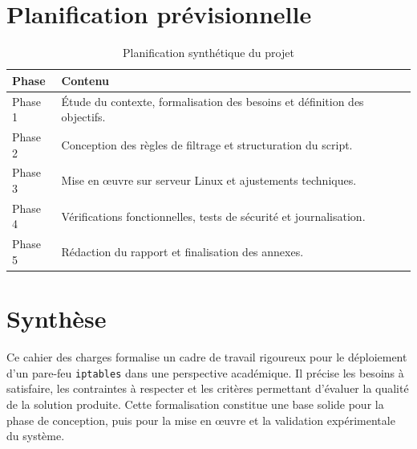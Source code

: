 \section{Planification prévisionnelle}

\begin{table}[H]
\centering
\caption{Planification synthétique du projet}
\begin{tabularx}{\textwidth}{|p{2.5cm}|X|}
\hline
\rowcolor{gray!20}
\textbf{Phase} & \textbf{Contenu} \\
\hline
Phase 1 & Étude du contexte, formalisation des besoins et définition des objectifs. \\
\hline
Phase 2 & Conception des règles de filtrage et structuration du script. \\
\hline
Phase 3 & Mise en œuvre sur serveur Linux et ajustements techniques. \\
\hline
Phase 4 & Vérifications fonctionnelles, tests de sécurité et journalisation. \\
\hline
Phase 5 & Rédaction du rapport et finalisation des annexes. \\
\hline
\end{tabularx}
\end{table}

\section{Synthèse}

Ce cahier des charges formalise un cadre de travail rigoureux pour le déploiement d'un pare-feu \texttt{iptables} dans une perspective académique. Il précise les besoins à satisfaire, les contraintes à respecter et les critères permettant d'évaluer la qualité de la solution produite. Cette formalisation constitue une base solide pour la phase de conception, puis pour la mise en œuvre et la validation expérimentale du système.
